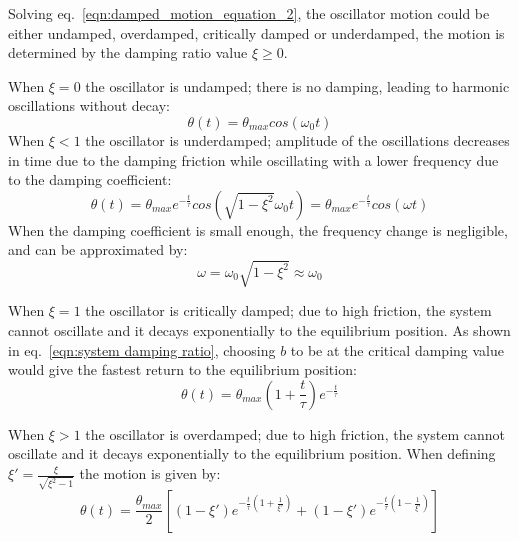 \documentclass[\main/master.tex]{subfiles}
\begin{document}
\par\noindent
Solving eq.~\ref{eqn:damped_motion_equation_2}, the oscillator motion could be either undamped, overdamped, critically damped or underdamped, the motion is determined by the damping ratio value $\xi\geq 0$. 
\par\noindent
When $\xi = 0$ the oscillator is undamped; there is no damping, leading to harmonic oscillations without decay:
\begin{equation}
\theta(t) = \theta_{max}cos(\omega_0 t )    \label{eqn:undamped_motion_equation_2}
\end{equation}
When $\xi < 1$ the oscillator is underdamped; amplitude of the oscillations decreases in time due to the damping friction while oscillating with a lower frequency due to the damping coefficient: 
\begin{equation}
\theta(t) = \theta_{max} e^{-\frac{t}{\tau}}cos(\sqrt{1-\xi^2}\omega_0 t ) =  \theta_{max} e^{-\frac{t}{\tau}}cos(\omega t )    \label{eqn:underdamped_motion_equation}
\end{equation}
When the damping coefficient is small enough, the frequency change is negligible, and can be approximated by:
\begin{equation}
\omega = \omega_0\sqrt{1-\xi^2}\approx\omega_0    \label{eqn:underdamped_frequency}
\end{equation}
\par\noindent
When $\xi = 1$ the oscillator is critically damped; due to high friction, the system cannot oscillate and it decays exponentially to the equilibrium position. As shown in eq.~\ref{eqn:system damping ratio}, choosing $b$ to be at the critical damping value would give the fastest return to the equilibrium position:
\begin{equation}
\theta(t) = \theta_{max}(1+\frac{t}{\tau}) e^{-\frac{t}{\tau}}     \label{eqn:critically_damped_motion_equation}
\end{equation}
\par\noindent
When $\xi > 1$ the oscillator is overdamped; due to high friction, the system cannot oscillate and it decays exponentially to the equilibrium position. When defining $\xi'  = \frac{\xi}{\sqrt{\xi^2 - 1}}$ the motion is given by: 
\begin{equation}
\theta(t) = \frac{\theta_{max}}{2} [ (1-\xi')e^{-\frac{t}{\tau}(1+\frac{1}{\xi'})} +(1-\xi')e^{-\frac{t}{\tau}(1-\frac{1}{\xi'})} ]
\label{eqn:overdamped_motion_equation}
\end{equation}
\end{document}
